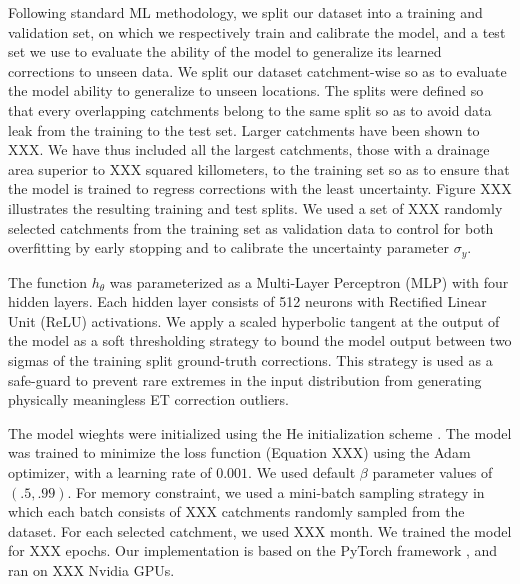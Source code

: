 \documentclass[draft]{agujournal2019}
\begin{document}
Following standard ML methodology, we split our dataset into a training and validation set, 
on which we respectively train and calibrate the model,
and a test set we use to evaluate the ability of the model to generalize its learned corrections to unseen data.
We split our dataset catchment-wise so as to evaluate the model ability to generalize to unseen locations.
The splits were defined so that every overlapping catchments belong to the same split 
so as to avoid data leak from the training to the test set.
Larger catchments have been shown to XXX. 
We have thus included all the largest catchments, those with a drainage area superior to XXX squared killometers, 
to the training set so as to ensure that the model is trained to regress corrections with the least uncertainty.
Figure XXX illustrates the resulting training and test splits. 
We used a set of XXX randomly selected catchments from the training set as validation 
data to control for both overfitting by early stopping and to calibrate the uncertainty parameter $\sigma_y$.

The function $h_\theta$ was parameterized as a Multi-Layer Perceptron (MLP) with four hidden layers.
Each hidden layer consists of 512 neurons with Rectified Linear Unit (ReLU) activations.
We apply a scaled hyperbolic tangent at the output of the model as a soft thresholding strategy 
to bound the model output between two sigmas of the training split ground-truth corrections.
This strategy is used as a safe-guard to prevent rare extremes in the input distribution from 
generating physically meaningless ET correction outliers.
  
The model wieghts were initialized using the He initialization scheme \cite{XXX}.
The model was trained to minimize the loss function (Equation XXX) 
using the Adam optimizer, with a learning rate of $0.001$.
We used default $\beta$ parameter values of $(.5, .99)$.
For memory constraint, we used a mini-batch sampling strategy in which each batch consists of
XXX catchments randomly sampled from the dataset. 
For each selected catchment, we used XXX month.
We trained the model for XXX epochs.
Our implementation is based on the PyTorch framework \cite{XXX}, and ran on XXX Nvidia GPUs. 
\end{document}
